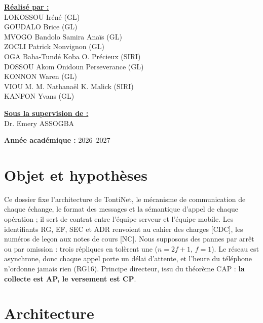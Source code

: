\documentclass[12pt,a4paper]{article}
\begin{document}
\begin{titlepage}
\begin{center}
\noindent
\begin{minipage}[t]{0.55\textwidth}
\underline{\textbf{Réalisé par :}}\\[6pt]
LOKOSSOU Iréné (GL)\\
GOUDALO Brice (GL)\\
MVOGO Bandolo Samira Anaïs (GL)\\
ZOCLI Patrick Nonvignon (GL)\\
OGA Baba-Tundé Koba O. Précieux (SIRI)\\
DOSSOU Akom Onidoun Perseverance (GL)\\
KONNON Waren (GL)\\
VIOU M. M. Nathanaël K. Malick (SIRI)\\
KANFON Yvans (GL)
\end{minipage}
\hfill
\begin{minipage}[t]{0.40\textwidth}\raggedleft
\underline{\textbf{Sous la supervision de :}}\\[8pt]
Dr. Emery ASSOGBA
\end{minipage}

\vfill
\textbf{Année académique :} 2026--2027
\end{center}
\end{titlepage}

{\hypersetup{linkcolor=black}\tableofcontents}   %
\newpage

\section{Objet et hypothèses}

Ce dossier fixe l'architecture de TontiNet, le mécanisme de communication de chaque échange, le
format des messages et la sémantique d'appel de chaque opération ; il sert de contrat entre
l'équipe serveur et l'équipe mobile. Les identifiants RG, EF, SEC et ADR renvoient au cahier des
charges [CDC], les numéros de leçon aux notes de cours [NC]. Nous supposons des pannes par arrêt
ou par omission : trois répliques en tolèrent une ($n = 2f + 1$, $f = 1$). Le réseau est
asynchrone, donc chaque appel porte un délai d'attente, et l'heure du téléphone n'ordonne jamais
rien (RG16). Principe directeur, issu du théorème CAP : \textbf{la collecte est AP, le versement
est CP}.

\section{Architecture}
\label{sec:architecture}
\end{document}
